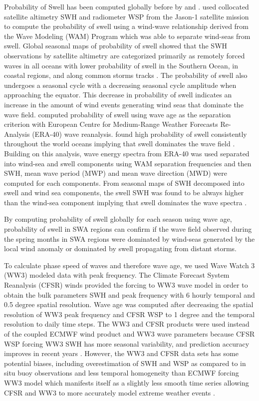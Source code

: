 \documentclass[draft,linenumbers]{agujournal2018}
\begin{document}
Probability of Swell has been computed globally before by \citet{jiang2013global} and \citet{semedo2011global}. \citet{jiang2013global} used collocated satellite altimetry SWH and radiometer WSP from the Jason-1 satellite mission to compute the probability of swell using a wind-wave relationship derived from the Wave Modeling (WAM) Program which was able to separate wind-seas from swell. Global seasonal maps of probability of swell showed that the SWH observations by satellite altimetry are categorized primarily as remotely forced waves in all oceans with lower probability of swell in the Southern Ocean, in coastal regions, and along common storms tracks \cite{jiang2013global}. The probability of swell also undergoes a seasonal cycle with a decreasing seasonal cycle amplitude when approaching the equator. This decrease in probability of swell indicates an increase in the amount of wind events generating wind seas that dominate the wave field. \citet{semedo2011global} computed probability of swell using wave age as the separation criterion with European Centre for Medium-Range Weather Forecasts Re-Analysis (ERA-40) wave reanalysis. \citet{semedo2011global} found high probability of swell consistently throughout the world oceans implying that swell dominates the wave field \cite{semedo2011global}. Building on this analysis, wave energy spectra from ERA-40 was used separated into wind-sea and swell components using WAM separation frequencies and then SWH, mean wave period (MWP) and mean wave direction (MWD) were computed for each components. From seasonal maps of SWH decomposed into swell and wind sea components, the swell SWH was found to be always higher than the wind-sea component implying that swell dominates the wave spectra \cite{semedo2011global}. 

By computing probability of swell globally for each season using wave age, probability of swell in SWA regions can confirm if the wave field observed during the spring months in SWA regions were dominated by wind-seas generated by the local wind anomaly or dominated by swell propagating from distant storms.  

To calculate phase speed of waves and therefore wave age, we used Wave Watch 3 (WW3) modeled data with peak frequency. The Climate Forecast System Reanalysis (CFSR) winds provided the forcing to WW3 wave model in order to obtain the bulk parameters SWH and peak frequency with 6 hourly temporal and 0.5 degree spatial resolution. Wave age was computed after decreasing the spatial resolution of WW3 peak frequency and CFSR WSP to 1 degree and the temporal resolution to daily time steps. The WW3 and CFSR products were used instead of the coupled ECMWF wind product and WW3 wave parameters because CFSR WSP forcing WW3 SWH has more seasonal variability, and prediction accuracy improves in recent years \cite{stopa2014intercomparison}. However, the WW3 and CFSR data sets has some potential biases, including overestimation of SWH and WSP as compared to in situ buoy observations and less temporal homogeneity than ECMWF forcing WW3 model which manifests itself as a slightly less smooth time series allowing CFSR and WW3 to more accurately model extreme weather events \cite{stopa2014intercomparison}.  
\end{document}
